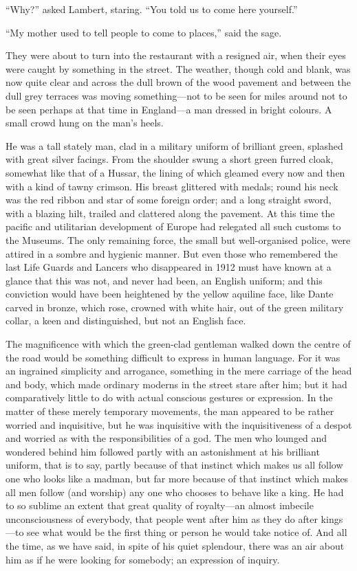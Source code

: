 \documentclass{book}
\begin{document}
“Why?” asked Lambert, staring. “You told us to come here yourself.”

“My mother used to tell people to come to places,” said the sage.

They were about to turn into the restaurant with a resigned air, when their eyes were caught by something in the street. The weather, though cold and blank, was now quite clear and across the dull brown of the wood pavement and between the dull grey terraces was moving something—not to be seen for miles around not to be seen perhaps at that time in England—a man dressed in bright colours. A small crowd hung on the man’s heels.

He was a tall stately man, clad in a military uniform of brilliant green, splashed with great silver facings. From the shoulder swung a short green furred cloak, somewhat like that of a Hussar, the lining of which gleamed every now and then with a kind of tawny crimson. His breast glittered with medals; round his neck was the red ribbon and star of some foreign order; and a long straight sword, with a blazing hilt, trailed and clattered along the pavement. At this time the pacific and utilitarian development of Europe had relegated all such customs to the Museums. The only remaining force, the small but well-organised police, were attired in a sombre and hygienic manner. But even those who remembered the last Life Guards and Lancers who disappeared in 1912 must have known at a glance that this was not, and never had been, an English uniform; and this conviction would have been heightened by the yellow aquiline face, like Dante carved in bronze, which rose, crowned with white hair, out of the green military collar, a keen and distinguished, but not an English face.

The magnificence with which the green-clad gentleman walked down the centre of the road would be something difficult to express in human language. For it was an ingrained simplicity and arrogance, something in the mere carriage of the head and body, which made ordinary moderns in the street stare after him; but it had comparatively little to do with actual conscious gestures or expression. In the matter of these merely temporary movements, the man appeared to be rather worried and inquisitive, but he was inquisitive with the inquisitiveness of a despot and worried as with the responsibilities of a god. The men who lounged and wondered behind him followed partly with an astonishment at his brilliant uniform, that is to say, partly because of that instinct which makes us all follow one who looks like a madman, but far more because of that instinct which makes all men follow (and worship) any one who chooses to behave like a king. He had to so sublime an extent that great quality of royalty—an almost imbecile unconsciousness of everybody, that people went after him as they do after kings—to see what would be the first thing or person he would take notice of. And all the time, as we have said, in spite of his quiet splendour, there was an air about him as if he were looking for somebody; an expression of inquiry.
\end{document}
